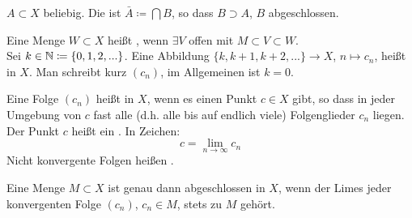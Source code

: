 \begin{definition}
$ A\subset X $ beliebig. Die  ist $ \bar A\coloneqq\bigcap B $, so dass $ B\supset A $, $ B $ abgeschlossen. 
\end{definition}
Eine Menge $ W\subset X $ hei\ss t , wenn $ \exists V $ offen mit $ M\subset V\subset W $.\\
Sei $ k\in\mathbb{N}\coloneqq\lbrace 0,1,2,...\rbrace $. Eine Abbildung $ \lbrace k,k+1,k+2,...\rbrace\rightarrow X $, $ n\mapsto c_n $, hei\ss t  in $ X $. Man schreibt kurz $ (c_n) $, im Allgemeinen ist $ k=0 $.\\
\begin{definition}
Eine Folge $ (c_n) $ hei\ss t  in $ X $, wenn es einen Punkt $ c\in X $ gibt, so dass in jeder Umgebung von $ c $ fast alle (d.h. alle bis auf endlich viele) Folgenglieder $ c_n $ liegen. Der Punkt $ c $ hei\ss t ein . In Zeichen:
\[ c=\lim_{n\to\infty}c_n \]
Nicht konvergente Folgen hei\ss en . 
\end{definition}
Eine Menge $ M\subset X $ ist genau dann abgeschlossen in $ X $, wenn der Limes jeder konvergenten Folge $ (c_n) $, $ c_n\in M $, stets zu $ M $ geh\"ort.